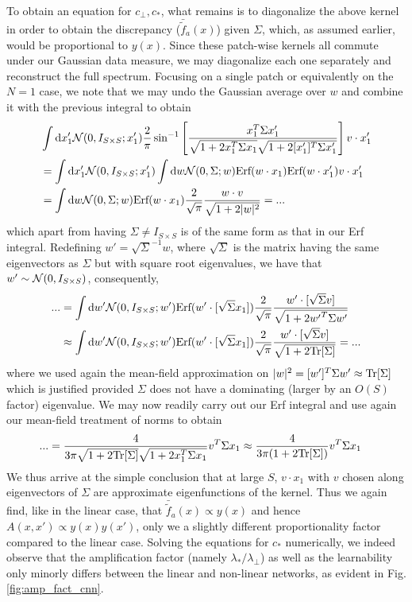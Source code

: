 To obtain an equation for $c_{\perp},c_*$, what remains is to diagonalize the above kernel in order to obtain the discrepancy ($\bar{\tilde{f}}_a(x)$) given $\Sigma$, which, as assumed earlier, would be proportional to $y(x)$. Since these patch-wise kernels all commute under our Gaussian data measure, we may diagonalize each one separately and reconstruct the full spectrum. Focusing on a single patch or equivalently on the $N=1$ case, we note that we may undo the Gaussian average over ${w}$ and combine it with the previous integral to obtain 
\begin{align}
&\int \text{d} x'_1 {\cal N}(0,I_{S \times S};x'_1) \frac{2}{\pi} \sin^{-1} \left[\frac{{x}^T_1 \Sigma {x}'_1}{\sqrt{1+2 {x}_1^T \Sigma {x}_1}\sqrt{1+2 [{x}'_1]^T \Sigma {x}'_1}} \right] {v} \cdot x'_1 \\ \nonumber 
&= \int \text{d} x'_1 {\cal N}(0,I_{S \times S};x'_1)\int \text{d} {w} {\cal N}(0,\Sigma;w) \text{Erf}({w} \cdot x_1)\text{Erf}({w} \cdot x'_1) { v}\cdot x'_1 \\ \nonumber 
&= \int \text{d} {w} {\cal N}(0,\Sigma;w) \text{Erf}({w} \cdot x_1)\frac{2}{\sqrt{\pi}} \frac{{w} \cdot { v}}{\sqrt{1+2|{w}|^2}} = ... 
\end{align}
which apart from having $\Sigma \neq I_{S \times S}$ is of the same form as that in our Erf integral. Redefining ${w}'=\sqrt{\Sigma}^{-1} w$, where $\sqrt{\Sigma}$ is the matrix having the same eigenvectors as $\Sigma$ but with square root eigenvalues, we have that ${w}' \sim {\cal N}(0,I_{S \times S})$, consequently,  
\begin{align}
... &= \int \text{d} {w}' {\cal N}(0,I_{S\times S};{w}') \text{Erf}({w}' \cdot [\sqrt{\Sigma} x_1]) \frac{2}{\sqrt{\pi}} \frac{{w}' \cdot [\sqrt{\Sigma} { v}]}{\sqrt{1+2{w'}^T \Sigma {w}'}} \\ \nonumber 
&\approx \int \text{d}{w}' {\cal N}(0,I_{S\times S};{w}') \text{Erf}({w}' \cdot [\sqrt{\Sigma} x_1]) \frac{2}{\sqrt{\pi}} \frac{{w}' \cdot [\sqrt{\Sigma}{ v}]}{\sqrt{1+2\text{Tr}[\Sigma]}}=...
\end{align}
where we used again the mean-field approximation on $|{w}|^2=[{w}']^T \Sigma {w'}\approx \text{Tr}[\Sigma]$ which is justified provided $\Sigma$ does not have a dominating (larger by an $O(S)$ factor) eigenvalue. We may now readily carry out our Erf integral and use again our mean-field treatment of norms to obtain 
\begin{align}
... &= \frac{4}{3\pi \sqrt{1+2\text{Tr}[\Sigma]}\sqrt{1+2x_1^T \Sigma x_1}} {v}^T \Sigma x_1 \approx \frac{4}{3\pi(1+2\text{Tr}[\Sigma])} {v}^T \Sigma x_1  
\end{align}
We thus arrive at the simple conclusion that at large $S$, ${v} \cdot x_1$ with ${v}$ chosen along eigenvectors of $\Sigma$ are approximate eigenfunctions of the kernel. Thus we again find, like in the linear case, that $\bar{\tilde{f}}_a(x) \propto y(x)$ and hence $A(x,x')\propto y(x)y(x')$, only we a slightly different proportionality factor compared to the linear case.  Solving the equations for $c_*$ numerically, we indeed observe that the amplification factor (namely $\lambda_*/\lambda_{\perp}$) as well as the learnability only minorly differs between the linear and non-linear networks, as evident in Fig. \ref{fig:amp_fact_cnn}.  

